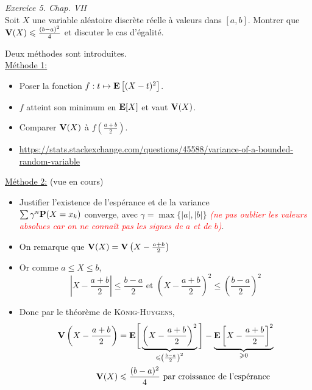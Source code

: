 \begin{exercice}    
    \emph{Exercice 5. Chap. VII}\\
    Soit $X$ une variable aléatoire discrète réelle à valeurs dans $[a, b]$. Montrer que $\V(X) \leqslant \frac{(b-a)^2}{4}$ et discuter le cas d'égalité.
\end{exercice}

\begin{solution}
    Deux méthodes sont introduites.\\
    \underline{Méthode 1:}
    \begin{itemize}
        \item Poser la fonction $f:t \mapsto \E \left[(X-t)^2 \right]$.
        \item $f$ atteint son minimum en $\E[X]$ et vaut $\V(X)$. 
        \item Comparer $\V(X)$ à $f \left( \frac{a + b}{2} \right)$.
        \item \url{https://stats.stackexchange.com/questions/45588/variance-of-a-bounded-random-variable}
    \end{itemize}
    
    \underline{Méthode 2:} (vue en cours)
    \begin{itemize}
        \item Justifier l'existence de l'espérance et de la variance\\
        $\sum \gamma^n \P(X=x_k)$ converge, avec $\gamma = \max \{ |a|, |b| \}$ \textcolor{red}{\emph{(ne pas oublier les valeurs absolues  car on ne connaît pas les signes de $a$ et de $b$)}}.
        \item On remarque que $\V(X) = \V \left( X - \frac{a+b}{2} \right)$
        \item Or comme $a \leqslant X \leqslant b$, $$\displaystyle \left| X - \frac{a+b}{2}\right| \leqslant \frac{b-a}{2} \text{ et } \displaystyle \left( X - \frac{a+b}{2} \right)^2 \leqslant \left(\frac{b-a}{2}\right)^2$$
        \item Donc par le théorème de \textsc{König}-\textsc{Huygens}, 
        \begin{align*}
            \V \left(X - \frac{a+b}{2} \right) &= \E \Bigg[ \underbrace{\left(X - \frac{a+b}{2} \right)^2}_{\leqslant \left( \frac{b-a}{2} \right)^2} \Bigg] - \underbrace{\E \left[X-\frac{a+b}{2} \right]^2}_{\geqslant 0} \\
            \V(X) &\leqslant \frac{(b-a)^2}{4} \text{ par croissance de l'espérance}
        \end{align*}
    \end{itemize}
    

\end{solution}
